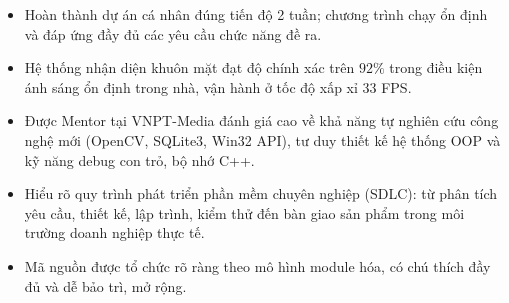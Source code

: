 \documentclass[12pt,a4paper]{article}
\begin{document}
\begin{itemize}
    \item Hoàn thành dự án cá nhân đúng tiến độ 2 tuần; chương trình chạy ổn định và đáp ứng đầy đủ các yêu cầu chức năng đề ra.
    \item Hệ thống nhận diện khuôn mặt đạt độ chính xác trên $92\%$ trong điều kiện ánh sáng ổn định trong nhà, vận hành ở tốc độ xấp xỉ 33 FPS.
    \item Được Mentor tại VNPT-Media đánh giá cao về khả năng tự nghiên cứu công nghệ mới (OpenCV, SQLite3, Win32 API), tư duy thiết kế hệ thống OOP và kỹ năng debug con trỏ, bộ nhớ C++.
    \item Hiểu rõ quy trình phát triển phần mềm chuyên nghiệp (SDLC): từ phân tích yêu cầu, thiết kế, lập trình, kiểm thử đến bàn giao sản phẩm trong môi trường doanh nghiệp thực tế.
    \item Mã nguồn được tổ chức rõ ràng theo mô hình module hóa, có chú thích đầy đủ và dễ bảo trì, mở rộng.
\end{itemize}
\end{document}
